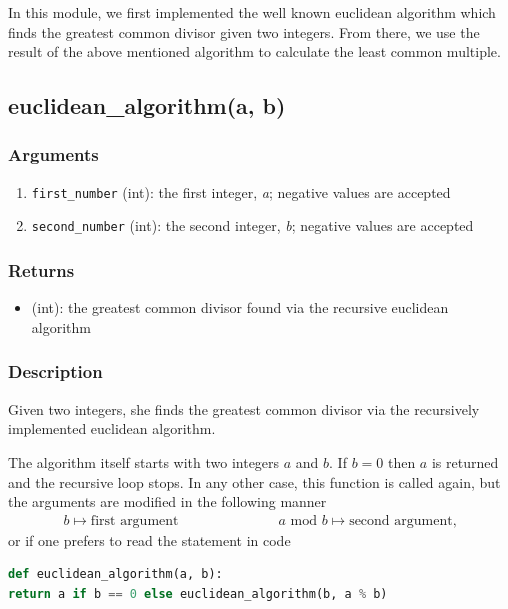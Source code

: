 \documentclass[refman]{scrartcl}
\newcommand{\mymod}{\text{\ \ mod\ \ }}
\begin{document}
In this module, we first implemented the well known euclidean algorithm which finds the greatest common divisor given two integers. From there, we use the result of the above mentioned algorithm to calculate the least common multiple.

\subsection{euclidean\_algorithm(a, b)}

\subsubsection*{Arguments}

\begin{enumerate}
  \item \texttt{first\_number} (int): the first integer, \textit{a}; negative values are accepted
  \item \texttt{second\_number} (int): the second integer, \textit{b}; negative values are accepted
\end{enumerate}

\subsubsection*{Returns}

\begin{itemize}
  \item (int): the greatest common divisor found via the recursive euclidean algorithm
\end{itemize}

\subsubsection*{Description}

Given two integers, she finds the greatest common divisor via the recursively implemented euclidean algorithm.

The algorithm itself starts with two integers \(a\) and \(b\). If \(b = 0\) then \(a\) is returned and the recursive loop stops. In any other case, this function is called again, but the arguments are modified in the following manner
%
\begin{align*}
	b \mapsto \text{first argument} \hspace{3cm} a \mymod b \mapsto \text{second argument} \text{,}
\end{align*}
%
or if one prefers to read the statement in code
%
\begin{lstlisting}[language=Python]
def euclidean_algorithm(a, b):
return a if b == 0 else euclidean_algorithm(b, a % b)
\end{lstlisting}
\end{document}
